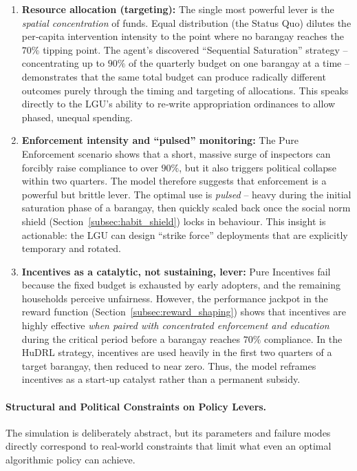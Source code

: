 \begin{enumerate}
    \item \textbf{Resource allocation (targeting):} The single most powerful lever is the \emph{spatial concentration} of funds. Equal distribution (the Status Quo) dilutes the per‑capita intervention intensity to the point where no barangay reaches the \(70\%\) tipping point. The agent’s discovered “Sequential Saturation” strategy – concentrating up to \(90\%\) of the quarterly budget on one barangay at a time – demonstrates that the same total budget can produce radically different outcomes purely through the timing and targeting of allocations. This speaks directly to the LGU’s ability to re‑write appropriation ordinances to allow phased, unequal spending.
    \item \textbf{Enforcement intensity and “pulsed” monitoring:} The Pure Enforcement scenario shows that a short, massive surge of inspectors can forcibly raise compliance to over \(90\%\), but it also triggers political collapse within two quarters. The model therefore suggests that enforcement is a powerful but brittle lever. The optimal use is \emph{pulsed} – heavy during the initial saturation phase of a barangay, then quickly scaled back once the social norm shield (Section~\ref{subsec:habit_shield}) locks in behaviour. This insight is actionable: the LGU can design “strike force” deployments that are explicitly temporary and rotated.
    \item \textbf{Incentives as a catalytic, not sustaining, lever:} Pure Incentives fail because the fixed budget is exhausted by early adopters, and the remaining households perceive unfairness. However, the performance jackpot in the reward function (Section~\ref{subsec:reward_shaping}) shows that incentives are highly effective \emph{when paired with concentrated enforcement and education} during the critical period before a barangay reaches \(70\%\) compliance. In the HuDRL strategy, incentives are used heavily in the first two quarters of a target barangay, then reduced to near zero. Thus, the model reframes incentives as a start‑up catalyst rather than a permanent subsidy.
\end{enumerate}

\paragraph{Structural and Political Constraints on Policy Levers.}
The simulation is deliberately abstract, but its parameters and failure modes directly correspond to real‑world constraints that limit what even an optimal algorithmic policy can achieve.

